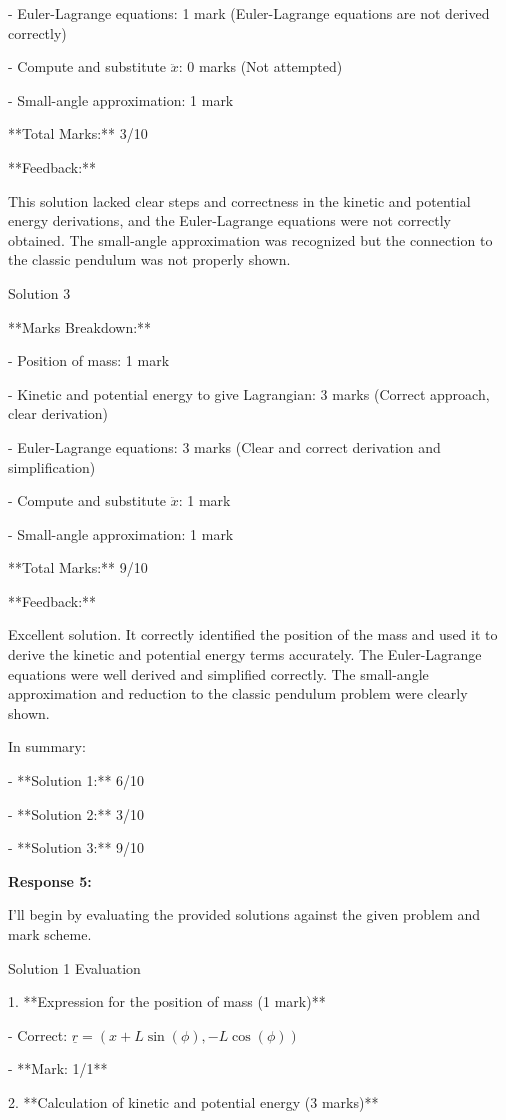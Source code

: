 \documentclass[a4paper,11pt]{article}
\begin{document}
- Euler-Lagrange equations: 1 mark (Euler-Lagrange equations are not derived correctly)

- Compute and substitute \(\ddot{x}\): 0 marks (Not attempted)

- Small-angle approximation: 1 mark

**Total Marks:** 3/10

**Feedback:**

This solution lacked clear steps and correctness in the kinetic and potential energy derivations, and the Euler-Lagrange equations were not correctly obtained. The small-angle approximation was recognized but the connection to the classic pendulum was not properly shown.

Solution 3

**Marks Breakdown:**

- Position of mass: 1 mark

- Kinetic and potential energy to give Lagrangian: 3 marks (Correct approach, clear derivation)

- Euler-Lagrange equations: 3 marks (Clear and correct derivation and simplification)

- Compute and substitute \(\ddot{x}\): 1 mark

- Small-angle approximation: 1 mark

**Total Marks:** 9/10

**Feedback:**

Excellent solution. It correctly identified the position of the mass and used it to derive the kinetic and potential energy terms accurately. The Euler-Lagrange equations were well derived and simplified correctly. The small-angle approximation and reduction to the classic pendulum problem were clearly shown.

In summary:

- **Solution 1:** 6/10

- **Solution 2:** 3/10

- **Solution 3:** 9/10

\bigskip
\textbf{Response 5:}

I'll begin by evaluating the provided solutions against the given problem and mark scheme.

Solution 1 Evaluation

1. **Expression for the position of mass (1 mark)**

   - Correct: \( \underline{r} = (x + L \sin(\phi), -L \cos(\phi)) \)
   
   - **Mark: 1/1**

2. **Calculation of kinetic and potential energy (3 marks)**
\end{document}
